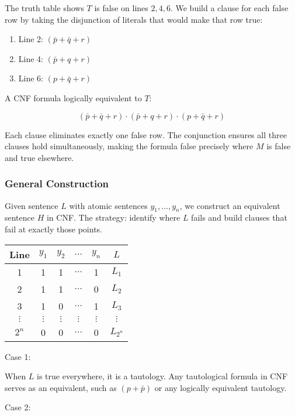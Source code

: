 \documentclass[12pt,a4paper,openany]{article}
\begin{document}
The truth table shows $T$ is false on lines $2, 4, 6$. We build a
clause for each false row by taking the disjunction of literals that
would make that row true:

\begin{enumerate}
\item Line 2: $(\bar p + \bar q + r)$
\item Line 4: $(\bar p + q + r)$
\item Line 6: $(p + \bar q + r)$
\end{enumerate}

A CNF formula logically equivalent to $T$:

$$(\bar p + \bar q + r) \cdot (\bar p + q + r) \cdot (p + \bar q + r)$$

Each clause eliminates exactly one false row. The conjunction ensures
all three clauses hold simultaneously, making the formula false
precisely where $M$ is false and true elsewhere.

\subsubsection{General Construction}

Given sentence $L$ with atomic sentences $y_1, \dots, y_n$, we
construct an equivalent sentence $H$ in CNF. The strategy: identify
where $L$ fails and build clauses that fail at exactly those points.

\begin{center}
\begin{tabular}{|c|c|c|c|c|c|}
\hline
Line & $y_1$ & $y_2$ & $\dots$ & $y_n$ & $L$ \\
\hline
1 & 1 & 1 & $\dots$ & 1 & $L_1$ \\
\hline
2 & 1 & 1 & $\dots$ & 0 & $L_2$ \\
\hline
3 & 1 & 0 & $\dots$ & 1 & $L_3$ \\
\hline
$\vdots$ & $\vdots$ & $\vdots$ & $\vdots$ & $\vdots$ & $\vdots$ \\
\hline
$2^n$ & 0 & 0 & $\dots$ & 0 & $L_{2^n}$ \\
\hline
\end{tabular}
\end{center}

Case 1:

When $L$ is true everywhere, it is a tautology. Any tautological
formula in CNF serves as an equivalent, such as $(p + \bar{p})$ or any
logically equivalent tautology.

Case 2:
\end{document}
